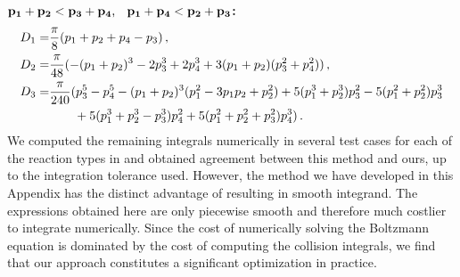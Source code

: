 ${\bf p_1+p_2<p_3+p_4\text{, \hspace{1mm} }p_1+p_4<p_2+p_3}${\bf :}
\begin{align}
D_1=&\frac{\pi}{8}(p_1+p_2+p_4-p_3)\,,\\
D_2=&\frac{\pi}{48}(-(p_1+p_2)^3-2p_3^3+2p_4^3+3(p_1+p_2)(p_3^2+p_4^2))\,,\notag\\
D_3=&\frac{\pi}{240}(p_3^5-p_4^5-(p_1+p_2)^3(p_1^2-3p_1p_2+p_2^2)+5(p_1^3+p_2^3)p_3^2-5(p_1^2+p_2^2)p_3^3\notag\\
&\hspace{7mm}+5(p_1^3+p_2^3-p_3^3)p_4^2+5(p_1^2+p_2^2+p_3^2)p_4^3)\,.\notag
\end{align}
We computed the remaining integrals numerically in several test cases for each of the reaction types in  and obtained agreement between this method and ours, up to the integration tolerance used.  However, the method we have developed in this Appendix has the distinct advantage of resulting in  smooth integrand.  The expressions obtained here are only piecewise smooth and therefore much costlier to integrate numerically.  Since the cost of numerically solving the Boltzmann equation is dominated by the cost of computing the collision integrals, we find that our approach constitutes a  significant optimization in practice.



